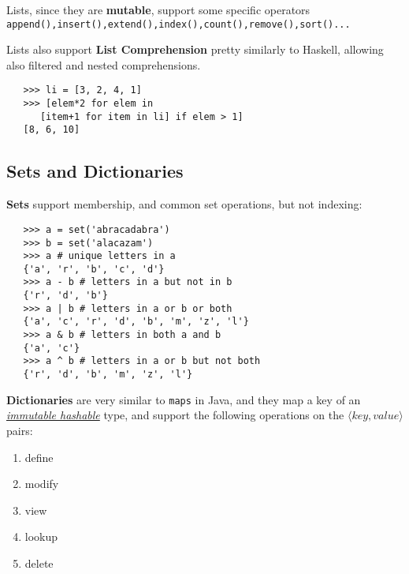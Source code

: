 Lists, since they are \textbf{mutable}, support some specific operators \lstinline|append(),insert(),extend(),index(),count(),remove(),sort()...| 

Lists also support \textbf{List Comprehension} pretty similarly to Haskell, allowing also filtered and nested comprehensions.
\begin{lstlisting}
   >>> li = [3, 2, 4, 1]
   >>> [elem*2 for elem in
      [item+1 for item in li] if elem > 1]
   [8, 6, 10]
\end{lstlisting}

\subsection{Sets and Dictionaries}
\textbf{Sets} support membership, and common set operations, but not indexing:
\begin{lstlisting}
   >>> a = set('abracadabra')
   >>> b = set('alacazam')
   >>> a # unique letters in a
   {'a', 'r', 'b', 'c', 'd'}
   >>> a - b # letters in a but not in b
   {'r', 'd', 'b'}
   >>> a | b # letters in a or b or both
   {'a', 'c', 'r', 'd', 'b', 'm', 'z', 'l'}
   >>> a & b # letters in both a and b
   {'a', 'c'}
   >>> a ^ b # letters in a or b but not both
   {'r', 'd', 'b', 'm', 'z', 'l'}
\end{lstlisting}

\textbf{Dictionaries} are very similar to \lstinline|maps| in Java, and they map a key of an \underline{\textit{immutable hashable}} type,
and support the following operations on the $\langle key,value \rangle$pairs:
\begin{enumerate}
   \item define
   \item modify
   \item view
   \item lookup
   \item delete
\end{enumerate}